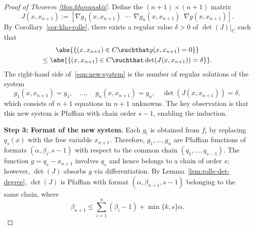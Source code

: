 \begin{proof}[Proof of Theorem \ref{thm:khovanskii}]
Define the $(n+1) \times (n+1)$ matrix
\begin{equation} \label{eqn:matrix-J}
  J(x, x_{n+1}) := \left[\nabla g_1(x, x_{n+1}) \enspace \cdots \enspace \nabla g_n(x, x_{n+1}) \enspace \nabla g(x, x_{n+1}) \right].
\end{equation}
By Corollary~\ref{cor:kho-rolle}, there exists a regular value $\delta > 0$ of $\det(J)|_C$ such that
\begin{multline} \label{eqn:new-system}
  \abs{\left\{(x, x_{n+1}) \in C \suchthat g(x, x_{n+1}) = 0\right\}} \\
  \le \abs{\left\{(x, x_{n+1}) \in C \suchthat \det(J(x, x_{n+1})) = \delta\right\}}.
\end{multline}
The right-hand side of~\eqref{eqn:new-system} is the number of regular solutions of the system
\begin{equation} \label{eqn:lifted-system}
  g_1(x, x_{n+1}) = y_1, \quad \ldots, \quad g_n(x, x_{n+1}) = y_n, \quad \det(J(x, x_{n+1})) = \delta,
\end{equation}
which consists of $n+1$ equations in $n+1$ unknowns. The key observation is that this new system is Pfaffian with chain order $s-1$, enabling the induction.

\medskip
\noindent\textbf{Step 3: Format of the new system.}
Each $g_i$ is obtained from $f_i$ by replacing $q_s(x)$ with the free variable $x_{n+1}$. Therefore, $g_1, \ldots, g_n$ are Pfaffian functions of formats $(\alpha, \beta_i, s-1)$ with respect to the common chain $(q_1, \ldots, q_{s-1})$. The function $g = q_s - x_{n+1}$ involves $q_s$ and hence belongs to a chain of order $s$; however, $\det(J)$ absorbs $g$ via differentiation. By Lemma~\ref{lem:rolle-det-degree}, $\det(J)$ is Pfaffian with format $(\alpha, \beta_{n+1}, s-1)$ belonging to the same chain, where
\begin{equation} \label{eqn:beta-n+1-ub}
  \beta_{n+1} \le \sum_{i=1}^n (\beta_i - 1) + \min\{k, s\}\alpha.
\end{equation}


\end{proof}
